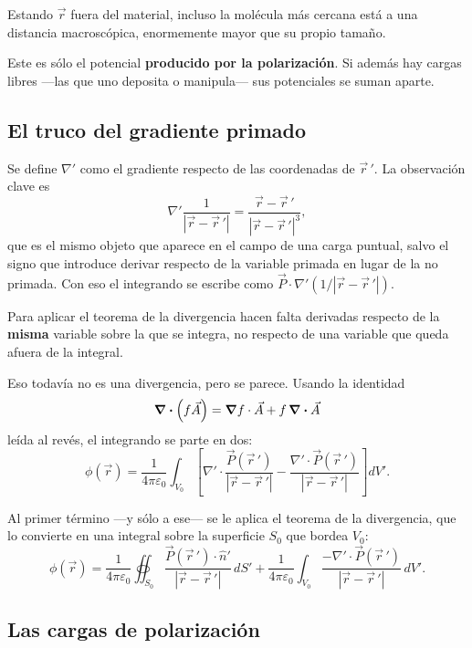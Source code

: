 \documentclass[12pt,a4paper]{article}
\begin{document}
\begin{notebox}
Estando $\vec r$ fuera del material, incluso la molécula más cercana está a una
distancia macroscópica, enormemente mayor que su propio tamaño.
\end{notebox}

Este es sólo el potencial \textbf{producido por la polarización}. Si además hay
cargas libres ---las que uno deposita o manipula--- sus potenciales se suman
aparte.

\subsection{El truco del gradiente primado}

Se define $\nabla'$ como el gradiente respecto de las coordenadas de
$\vec r\,'$. La observación clave es
\[
\nabla' \frac{1}{|\vec r - \vec r\,'|}
= \frac{\vec r - \vec r\,'}{|\vec r - \vec r\,'|^3},
\]
que es el mismo objeto que aparece en el campo de una carga puntual, salvo el
signo que introduce derivar respecto de la variable primada en lugar de la no
primada. Con eso el integrando se escribe como
$\vec P \cdot \nabla'\!\left(1/|\vec r - \vec r\,'|\right)$.

\begin{notebox}
Para aplicar el teorema de la divergencia hacen falta derivadas respecto de la
\textbf{misma} variable sobre la que se integra, no respecto de una variable que
queda afuera de la integral.
\end{notebox}

Eso todavía no es una divergencia, pero se parece. Usando la identidad
\[
\div(f\vec A) = \grad f \cdot \vec A + f \, \div \vec A
\]
leída al revés, el integrando se parte en dos:
\[
\phi(\vec r) = \frac{1}{4\pi\varepsilon_0} \int_{V_0}
\left[ \nabla' \cdot \frac{\vec P(\vec r\,')}{|\vec r - \vec r\,'|}
- \frac{\nabla' \cdot \vec P(\vec r\,')}{|\vec r - \vec r\,'|} \right] dV' .
\]

Al primer término ---y sólo a ese--- se le aplica el teorema de la divergencia,
que lo convierte en una integral sobre la superficie $S_0$ que bordea $V_0$:
\[
\phi(\vec r) = \frac{1}{4\pi\varepsilon_0} \oiint_{S_0}
\frac{\vec P(\vec r\,') \cdot \hat n'}{|\vec r - \vec r\,'|}\, dS'
+ \frac{1}{4\pi\varepsilon_0} \int_{V_0}
\frac{-\nabla' \cdot \vec P(\vec r\,')}{|\vec r - \vec r\,'|}\, dV' .
\]

\subsection{Las cargas de polarización}
\end{document}
